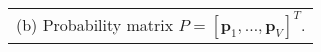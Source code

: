 \scriptsize
\begin{tabular}[t]{l}
	 (b) Probability matrix $P = [\bm{p}_1, \ldots, \bm{p}_V]^T$.
\end{tabular}